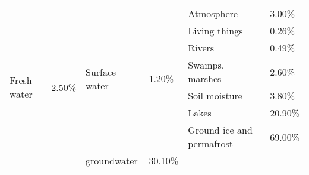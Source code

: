 \begin{itemize}
\begin{table}[ht]
\begin{center}
\begin{tabular}{|l|l|llll}
\hline
\multirow{9}{*}{Fresh water} & \multirow{9}{*}{2.50\%} & \multicolumn{1}{l|}{\multirow{7}{*}{Surface water}} & \multicolumn{1}{l|}{\multirow{7}{*}{1.20\%}} & \multicolumn{1}{l|}{Atmosphere}                & \multicolumn{1}{l|}{3.00\%}  \\ \cline{5-6} 
                             &                         & \multicolumn{1}{l|}{}                               & \multicolumn{1}{l|}{}                        & \multicolumn{1}{l|}{Living things}             & \multicolumn{1}{l|}{0.26\%}  \\ \cline{5-6} 
                             &                         & \multicolumn{1}{l|}{}                               & \multicolumn{1}{l|}{}                        & \multicolumn{1}{l|}{Rivers}                    & \multicolumn{1}{l|}{0.49\%}  \\ \cline{5-6} 
                             &                         & \multicolumn{1}{l|}{}                               & \multicolumn{1}{l|}{}                        & \multicolumn{1}{l|}{Swamps, marshes}           & \multicolumn{1}{l|}{2.60\%}  \\ \cline{5-6} 
                             &                         & \multicolumn{1}{l|}{}                               & \multicolumn{1}{l|}{}                        & \multicolumn{1}{l|}{Soil moisture}             & \multicolumn{1}{l|}{3.80\%}  \\ \cline{5-6} 
                             &                         & \multicolumn{1}{l|}{}                               & \multicolumn{1}{l|}{}                        & \multicolumn{1}{l|}{Lakes}                     & \multicolumn{1}{l|}{20.90\%} \\ \cline{5-6} 
                             &                         & \multicolumn{1}{l|}{}                               & \multicolumn{1}{l|}{}                        & \multicolumn{1}{l|}{Ground ice and permafrost} & \multicolumn{1}{l|}{69.00\%} \\ \cline{3-6} 
                             &                         & \multicolumn{1}{l|}{groundwater}                   & \multicolumn{1}{l|}{30.10\%}                 &                                                &                              \\ \cline{3-4}

\end{tabular}
\end{center}
\end{table}
\end{itemize}
